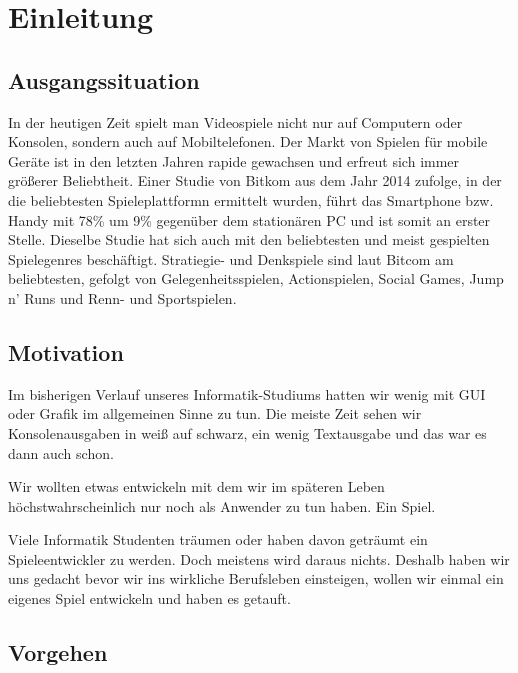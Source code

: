 \chapter{Einleitung}\label{ch:intro}

\section{Ausgangssituation}\label{sec:1_Ausgangssituation}

In der heutigen Zeit spielt man Videospiele nicht nur auf Computern oder Konsolen, sondern auch auf Mobiltelefonen. Der Markt von Spielen für mobile Geräte ist in den letzten Jahren rapide gewachsen und erfreut sich immer größerer Beliebtheit. Einer Studie von Bitkom \cite{bitkomgaming} aus dem Jahr 2014 zufolge, in der die beliebtesten Spieleplattformn ermittelt wurden, führt das Smartphone bzw. Handy mit 78\% um 9\% gegenüber dem stationären PC und ist somit an erster Stelle. Dieselbe Studie hat sich auch mit den beliebtesten und meist gespielten Spielegenres beschäftigt. Stratiegie- und Denkspiele sind laut Bitcom am beliebtesten, gefolgt von Gelegenheitsspielen, Actionspielen, Social Games, Jump n' Runs und Renn- und Sportspielen.



\section{Motivation}\label{sec:1_Motivation}

Im bisherigen Verlauf unseres Informatik-Studiums hatten wir wenig mit GUI oder Grafik im allgemeinen Sinne zu tun. Die meiste Zeit sehen wir Konsolenausgaben in weiß auf schwarz, ein wenig Textausgabe und das war es dann auch schon. 

Wir wollten etwas entwickeln mit dem wir im späteren Leben höchstwahrscheinlich nur noch als Anwender zu tun haben. Ein Spiel. 

Viele Informatik Studenten träumen oder haben davon geträumt ein Spieleentwickler zu werden. Doch meistens wird daraus nichts. Deshalb haben wir uns gedacht bevor wir ins wirkliche Berufsleben einsteigen, wollen wir einmal ein eigenes Spiel entwickeln und haben es \gamename getauft.



\section{Vorgehen}\label{sec:1_Vorgehen}

